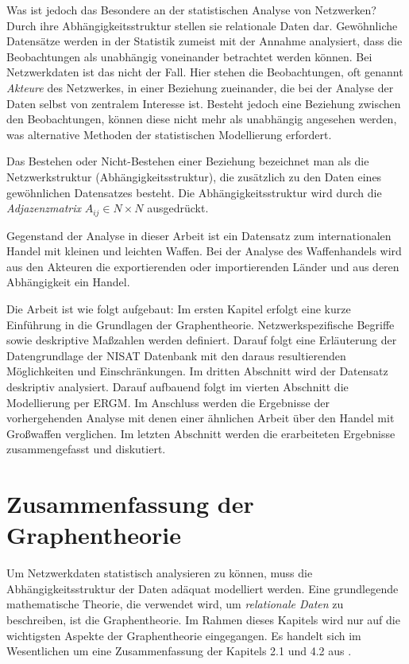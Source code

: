 \documentclass[a4paper,ngerman,oneside,titlepage,bibliography=totoc,11pt]{scrreprt}
\begin{document}
Was ist jedoch das Besondere an der statistischen Analyse von Netzwerken? Durch ihre Abhängigkeitsstruktur stellen sie relationale Daten dar. Gewöhnliche Datensätze werden in der Statistik zumeist mit der Annahme analysiert, dass die Beobachtungen als unabhängig voneinander betrachtet werden können. Bei Netzwerkdaten ist das nicht der Fall. Hier stehen die Beobachtungen, oft genannt \emph{Akteure} des Netzwerkes, in einer Beziehung zueinander, die bei der Analyse der Daten  selbst von zentralem Interesse ist. Besteht jedoch eine Beziehung zwischen den Beobachtungen, können diese nicht mehr als unabhängig angesehen werden, was alternative Methoden der statistischen Modellierung erfordert. 

Das Bestehen oder Nicht-Bestehen einer Beziehung bezeichnet man als die Netzwerkstruktur (Abhängigkeitsstruktur), die zusätzlich zu den Daten eines gewöhnlichen Datensatzes besteht. Die Abhängigkeitsstruktur wird durch die \emph{Adjazenzmatrix} $A_{ij} \in N \times N$ ausgedrückt.

Gegenstand der Analyse in dieser Arbeit ist ein Datensatz zum internationalen Handel mit kleinen und leichten Waffen. 
Bei der Analyse des Waffenhandels wird aus den Akteuren die exportierenden oder importierenden Länder und aus deren Abhängigkeit ein Handel.

Die Arbeit ist wie folgt aufgebaut: Im ersten Kapitel erfolgt eine kurze Einführung in die Grundlagen der Graphentheorie. Netzwerkspezifische Begriffe sowie deskriptive Maßzahlen werden definiert. Darauf folgt eine Erläuterung der Datengrundlage der NISAT Datenbank mit den daraus resultierenden Möglichkeiten und Einschränkungen. Im dritten Abschnitt wird der Datensatz deskriptiv analysiert. Darauf aufbauend folgt im vierten Abschnitt die Modellierung per ERGM. Im Anschluss werden die Ergebnisse der vorhergehenden Analyse mit denen einer ähnlichen Arbeit über den Handel mit Großwaffen verglichen. Im letzten Abschnitt werden die erarbeiteten Ergebnisse zusammengefasst und diskutiert.





\chapter{Zusammenfassung der Graphentheorie}

Um Netzwerkdaten statistisch analysieren zu können, muss die Abhängigkeitsstruktur der Daten adäquat modelliert werden. Eine grundlegende mathematische Theorie, die verwendet wird, um \emph{relationale Daten} zu beschreiben, ist die Graphentheorie. Im Rahmen dieses Kapitels wird nur auf die wichtigsten Aspekte der Graphentheorie eingegangen. Es handelt sich im Wesentlichen um eine Zusammenfassung der Kapitels 2.1 und 4.2 aus \citet{kol09}.
\end{document}
